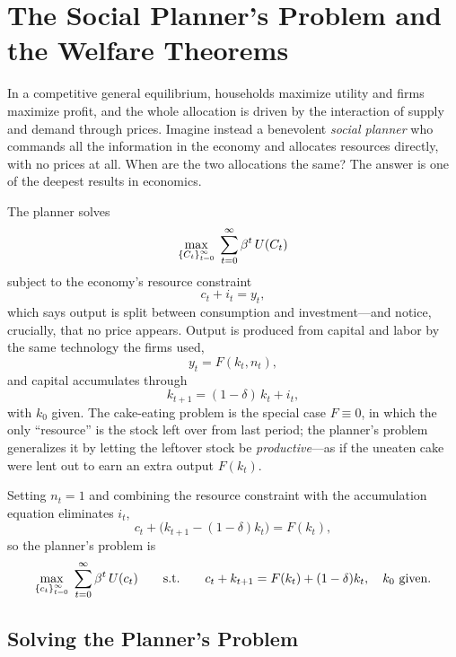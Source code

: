 
\section{The Social Planner's Problem and the Welfare Theorems}

In a competitive general equilibrium, households maximize utility and firms maximize profit, and the whole allocation is driven by the interaction of supply and demand through prices. Imagine instead a benevolent \emph{social planner} who commands all the information in the economy and allocates resources directly, with no prices at all. When are the two allocations the same? The answer is one of the deepest results in economics.

The planner solves
\[
\max_{\left\{C_t\right\}_{t=0}^{\infty}}\; \sum_{t=0}^{\infty} \beta^t\, U(C_t)
\]
subject to the economy's resource constraint
\[
c_t + i_t = y_t,
\]
which says output is split between consumption and investment---and notice, crucially, that no price appears. Output is produced from capital and labor by the same technology the firms used,
\[
y_t = F(k_t, n_t),
\]
and capital accumulates through
\[
k_{t+1} = (1-\delta)\,k_t + i_t,
\]
with $k_0$ given. The cake-eating problem is the special case $F \equiv 0$, in which the only ``resource'' is the stock left over from last period; the planner's problem generalizes it by letting the leftover stock be \emph{productive}---as if the uneaten cake were lent out to earn an extra output $F(k_t)$.

Setting $n_t = 1$ and combining the resource constraint with the accumulation equation eliminates $i_t$,
\[
c_t + \big(k_{t+1} - (1-\delta)k_t\big) = F(k_t),
\]
so the planner's problem is
\[
\max_{\left\{c_t\right\}_{t=0}^{\infty}}\; \sum_{t=0}^{\infty} \beta^t\, U(c_t)
\qquad \text{s.t.} \qquad
c_t + k_{t+1} = F(k_t) + (1-\delta)k_t, \quad k_0 \text{ given}.
\]

\subsection{Solving the Planner's Problem}

